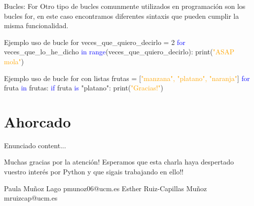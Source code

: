 \documentclass{beamer}
\begin{document}
\begin{frame}{Bucles: For}
Otro tipo de bucles comunmente utilizados en programación son los bucles for, en este caso encontramos diferentes sintaxis que pueden cumplir la misma funcionalidad.
\begin{Programexample}{Ejemplo uso de bucle for}
veces\_que\_quiero\_decirlo = 2 \newline
\textcolor{blue}{for} veces\_que\_lo\_he\_dicho \textcolor{blue}{in range}(veces\_que\_quiero\_decirlo): \newline
\hspace{2cm} print(\textcolor{orange}{"ASAP mola"})
\end{Programexample}
\begin{Programexample}{Ejemplo uso de bucle for con listas}
frutas = [\textcolor{orange}{"manzana", "platano", "naranja"}] \newline
\textcolor{blue}{for} fruta \textcolor{blue}{in} frutas: \newline
\textcolor{blue}{if} fruta \textcolor{blue}{is} "platano": \newline
\hspace{2cm} print(\textcolor{orange}{"Gracias!"})
\end{Programexample}
\end{frame}

\section{Ahorcado}

\begin{frame}{Enunciado}
content...
\end{frame}

\begin{frame}[focus]
Muchas gracias por la atención! \newline
Esperamos que esta charla haya despertado vuestro interés por Python y que sigais trabajando en ello!!
\end{frame}

\begin{frame}[focus]
Paula Muñoz Lago pmunoz06@ucm.es \newline
Esther Ruiz-Capillas Muñoz mruizcap@ucm.es
\end{frame}
\end{document}
